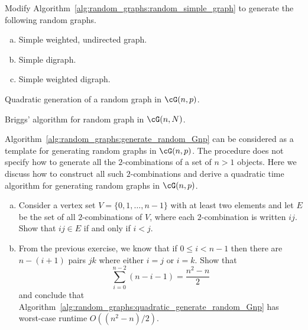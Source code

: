 \begin{problem}
\item Modify Algorithm~\ref{alg:random_graphs:random_simple_graph} to
  generate the following random graphs.
  \begin{enumerate}[(a)]
  \item Simple weighted, undirected graph.

  \item Simple digraph.

  \item Simple weighted digraph.
  \end{enumerate}

\begin{algorithm}[!htbp]

\caption{Quadratic generation of a random graph in $\cG(n,p)$.}
\label{alg:random_graphs:quadratic_generate_random_Gnp}
\end{algorithm}

\begin{algorithm}[!htbp]

\caption{Briggs' algorithm for random graph in $\cG(n,N)$.}
\label{alg:random_graphs:Briggs_random_GnN}
\end{algorithm}

\item\label{prob:random_graphs:quadratic_generate_random_Gnp}
  Algorithm~\ref{alg:random_graphs:generate_random_Gnp} can be
  considered as a template for generating random graphs in
  $\cG(n,p)$. The procedure does not specify how to generate all the
  $2$-combinations of a set of $n > 1$ objects. Here we discuss how to
  construct all such $2$-combinations and derive a quadratic time
  algorithm for generating random graphs in $\cG(n,p)$.
  \begin{enumerate}[(a)]
  \item Consider a vertex set $V = \{0, 1, \dots, n - 1\}$ with at
    least two elements and let $E$ be the set of all $2$-combinations
    of $V$, where each $2$-combination is written $ij$. Show that
    $ij \in E$ if and only if $i < j$.

  \item From the previous exercise, we know that if $0 \leq i < n - 1$
    then there are $n - (i + 1)$ pairs $jk$ where either $i = j$ or
    $i = k$. Show that
    \[
    \sum_{i=0}^{n-2} (n - i - 1)
    =
    \frac{n^2 - n}{2}
    \]
    and conclude that
    Algorithm~\ref{alg:random_graphs:quadratic_generate_random_Gnp}
    has worst-case runtime $O((n^2 - n) / 2)$.
  \end{enumerate}


\end{problem}
